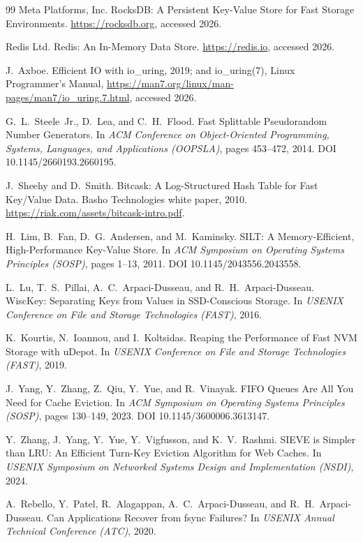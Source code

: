 \documentclass{article}
\begin{document}
\begin{thebibliography}{99}
 Meta Platforms, Inc.
RocksDB: A Persistent Key-Value Store for Fast Storage Environments.
\url{https://rocksdb.org}, accessed 2026.

 Redis Ltd.
Redis: An In-Memory Data Store.
\url{https://redis.io}, accessed 2026.

 J.~Axboe.
Efficient IO with io\_uring, 2019; and io\_uring(7), Linux Programmer's Manual, \url{https://man7.org/linux/man-pages/man7/io_uring.7.html}, accessed 2026.

 G.~L.~Steele~Jr., D.~Lea, and C.~H.~Flood.
Fast Splittable Pseudorandom Number Generators.
In \emph{ACM Conference on Object-Oriented Programming, Systems, Languages, and Applications (OOPSLA)}, pages 453--472, 2014. DOI 10.1145/2660193.2660195.

 J.~Sheehy and D.~Smith.
Bitcask: A Log-Structured Hash Table for Fast Key/Value Data.
Basho Technologies white paper, 2010. \url{https://riak.com/assets/bitcask-intro.pdf}.

 H.~Lim, B.~Fan, D.~G.~Andersen, and M.~Kaminsky.
SILT: A Memory-Efficient, High-Performance Key-Value Store.
In \emph{ACM Symposium on Operating Systems Principles (SOSP)}, pages 1--13, 2011. DOI 10.1145/2043556.2043558.

 L.~Lu, T.~S.~Pillai, A.~C.~Arpaci-Dusseau, and R.~H.~Arpaci-Dusseau.
WiscKey: Separating Keys from Values in SSD-Conscious Storage.
In \emph{USENIX Conference on File and Storage Technologies (FAST)}, 2016.

 K.~Kourtis, N.~Ioannou, and I.~Koltsidas.
Reaping the Performance of Fast NVM Storage with uDepot.
In \emph{USENIX Conference on File and Storage Technologies (FAST)}, 2019.

 J.~Yang, Y.~Zhang, Z.~Qiu, Y.~Yue, and R.~Vinayak.
FIFO Queues Are All You Need for Cache Eviction.
In \emph{ACM Symposium on Operating Systems Principles (SOSP)}, pages 130--149, 2023. DOI 10.1145/3600006.3613147.

 Y.~Zhang, J.~Yang, Y.~Yue, Y.~Vigfusson, and K.~V.~Rashmi.
SIEVE is Simpler than LRU: An Efficient Turn-Key Eviction Algorithm for Web Caches.
In \emph{USENIX Symposium on Networked Systems Design and Implementation (NSDI)}, 2024.

 A.~Rebello, Y.~Patel, R.~Alagappan, A.~C.~Arpaci-Dusseau, and R.~H.~Arpaci-Dusseau.
Can Applications Recover from fsync Failures?
In \emph{USENIX Annual Technical Conference (ATC)}, 2020.


\end{thebibliography}
\end{document}
